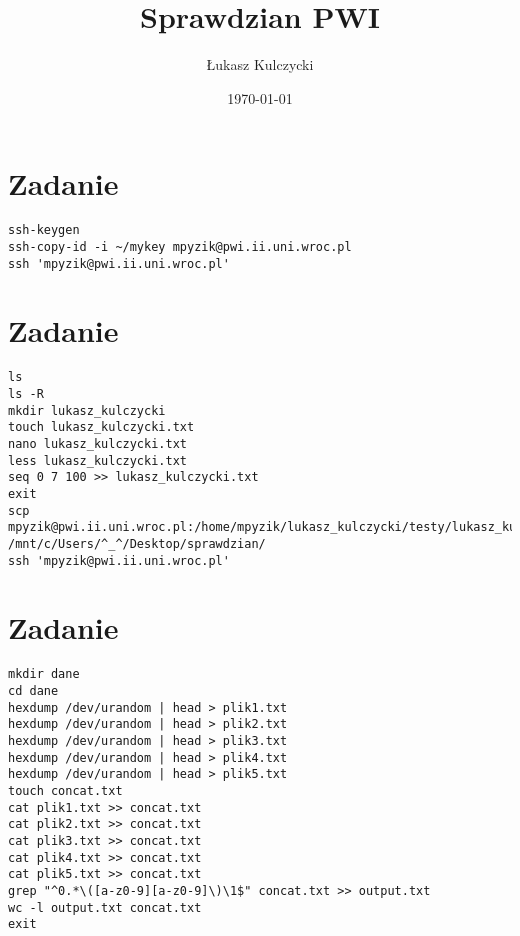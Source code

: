 \documentclass[a4paper]{article}
\author{Łukasz Kulczycki}
\title{Sprawdzian PWI}
\date{\today}
\begin{document}
\maketitle

\section{Zadanie}
\begin{verbatim}
ssh-keygen
ssh-copy-id -i ~/mykey mpyzik@pwi.ii.uni.wroc.pl
ssh 'mpyzik@pwi.ii.uni.wroc.pl'
\end{verbatim}

\section{Zadanie}
\begin{verbatim}
ls
ls -R
mkdir lukasz_kulczycki
touch lukasz_kulczycki.txt
nano lukasz_kulczycki.txt
less lukasz_kulczycki.txt
seq 0 7 100 >> lukasz_kulczycki.txt
exit
scp mpyzik@pwi.ii.uni.wroc.pl:/home/mpyzik/lukasz_kulczycki/testy/lukasz_kulczycki.txt 
/mnt/c/Users/^_^/Desktop/sprawdzian/
ssh 'mpyzik@pwi.ii.uni.wroc.pl'
\end{verbatim}

\section{Zadanie}
\begin{verbatim}
mkdir dane
cd dane
hexdump /dev/urandom | head > plik1.txt
hexdump /dev/urandom | head > plik2.txt
hexdump /dev/urandom | head > plik3.txt
hexdump /dev/urandom | head > plik4.txt
hexdump /dev/urandom | head > plik5.txt
touch concat.txt
cat plik1.txt >> concat.txt
cat plik2.txt >> concat.txt
cat plik3.txt >> concat.txt
cat plik4.txt >> concat.txt
cat plik5.txt >> concat.txt
grep "^0.*\([a-z0-9][a-z0-9]\)\1$" concat.txt >> output.txt
wc -l output.txt concat.txt
exit
\end{verbatim}
\end{document}
